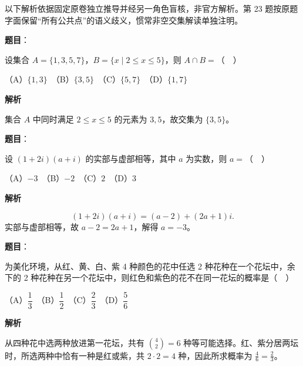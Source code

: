 

\begin{gktip}
以下解析依据固定原卷独立推导并经另一角色盲核，非官方解析。第 23 题按原题字面保留“所有公共点”的语义歧义，惯常非空交集解读单独注明。
\end{gktip}


\begin{answer}

\textbf{题目}：

设集合 \(A=\{1,3,5,7\}\)，\(B=\{x\mid 2\leq x\leq 5\}\)，则 \(A\cap B=\)（　）

   （A）\(\{1,3\}\)　（B）\(\{3,5\}\)　（C）\(\{5,7\}\)　（D）\(\{1,7\}\)

\textbf{解析}

集合 \(A\) 中同时满足 \(2\le x\le5\) 的元素为 \(3,5\)，故交集为 \(\{3,5\}\)。


\end{answer}
\begin{answer}

\textbf{题目}：

设 \((1+2i)(a+i)\) 的实部与虚部相等，其中 \(a\) 为实数，则 \(a=\)（　）

   （A）\(-3\)　（B）\(-2\)　（C）\(2\)　（D）\(3\)

\textbf{解析}

\nopagebreak[4]
\[
(1+2i)(a+i)=(a-2)+(2a+1)i.
\]
实部与虚部相等，故 \(a-2=2a+1\)，解得 \(a=-3\)。


\end{answer}
\begin{answer}

\textbf{题目}：

为美化环境，从红、黄、白、紫 4 种颜色的花中任选 2 种花种在一个花坛中，余下的 2 种花种在另一个花坛中，则红色和紫色的花不在同一花坛的概率是（　）

   （A）\(\dfrac{1}{3}\)　（B）\(\dfrac{1}{2}\)　（C）\(\dfrac{2}{3}\)　（D）\(\dfrac{5}{6}\)

\textbf{解析}

从四种花中选两种放进第一花坛，共有 \(\binom42=6\) 种等可能选择。红、紫分居两坛时，所选两种中恰有一种是红或紫，共 \(2\cdot2=4\) 种，因此所求概率为 \(\frac46=\frac23\)。


\end{answer}
